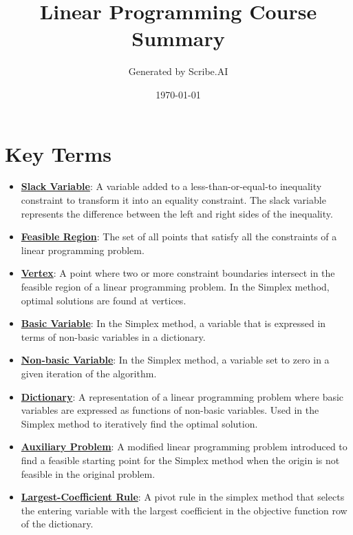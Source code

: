 \documentclass{article}%
\title{Linear Programming Course Summary}%
\author{Generated by Scribe.AI}%
\date{\today}%
\begin{document}
%
\normalsize%
\maketitle%
\section{Key Terms}%
\label{sec:KeyTerms}%
\begin{itemize}[leftmargin=*]%
\item \href{https://www.math.purdue.edu/~yipn/421/2024-08-27-ExSimplex.pdf#page=1}{\textbf{Slack Variable}}: A variable added to a less-than-or-equal-to inequality constraint to transform it into an equality constraint. The slack variable represents the difference between the left and right sides of the inequality.%
\item \href{https://www.math.purdue.edu/~yipn/421/2024-08-27-ExSimplex.pdf#page=4}{\textbf{Feasible Region}}: The set of all points that satisfy all the constraints of a linear programming problem.%
\item \href{https://www.math.purdue.edu/~yipn/421/2024-08-27-ExSimplex.pdf#page=5}{\textbf{Vertex}}: A point where two or more constraint boundaries intersect in the feasible region of a linear programming problem. In the Simplex method, optimal solutions are found at vertices.%
\item \href{https://www.math.purdue.edu/~yipn/421/2024-08-27-ExSimplex.pdf#page=6}{\textbf{Basic Variable}}: In the Simplex method, a variable that is expressed in terms of non-basic variables in a dictionary.%
\item \href{https://www.math.purdue.edu/~yipn/421/2024-08-27-ExSimplex.pdf#page=6}{\textbf{Non{-}basic Variable}}: In the Simplex method, a variable set to zero in a given iteration of the algorithm.%
\item \href{https://www.math.purdue.edu/~yipn/421/2024-08-27-ExSimplex.pdf#page=26}{\textbf{Dictionary}}: A representation of a linear programming problem where basic variables are expressed as functions of non-basic variables. Used in the Simplex method to iteratively find the optimal solution.%
\item \href{https://www.math.purdue.edu/~yipn/421/2024-08-27-ExSimplex.pdf#page=32}{\textbf{Auxiliary Problem}}: A modified linear programming problem introduced to find a feasible starting point for the Simplex method when the origin is not feasible in the original problem.%
\item \href{https://www.math.purdue.edu/~yipn/421/2024-09-05-SimplexEfficiency.pdf#page=4}{\textbf{Largest{-}Coefficient Rule}}: A pivot rule in the simplex method that selects the entering variable with the largest coefficient in the objective function row of the dictionary.%

\end{itemize}
\end{document}
